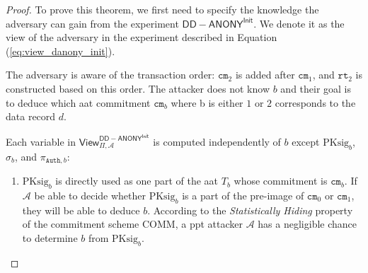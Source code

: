     \begin{proof}
        To prove this theorem, we first need to specify the knowledge the adversary can gain from  the experiment $\mathsf{DD-ANONY}^\mathsf{Init}$. We denote it as the view of the adversary in the experiment described in Equation (\ref{eq:view_danony_init}).


\begin{figure}[h]
\end{figure}


The adversary is aware of the transaction order: $\texttt{cm}_2$ is added after $\texttt{cm}_1$, and $\texttt{rt}_2$ is constructed based on this order. The attacker does not know $b$ and their goal is to deduce which \gls{aat} commitment $\texttt{cm}_b$ where b is either $1$ or $2$ corresponds to the data record $d$.

Each variable in $\mathsf{View}^{\mathsf{DD-ANONY}^\mathsf{Init}}_{\Pi, \mathcal{A}}$ is computed independently of  $b$ except $\text{PKsig}_b$, $\sigma_{b}$, and $\pi_{\texttt{Auth}, b}$:
\begin{enumerate}
    \item $\text{PKsig}_b$ is directly used as one part of the \gls{aat} $T_b$ whose commitment is $\texttt{cm}_b$. If $\mathcal{A}$ be able to decide whether $\text{PKsig}_b$ is a part of the pre-image of $\texttt{cm}_0$ or $\texttt{cm}_1$, they will be able to deduce $b$. According to the \textit{Statistically Hiding} property of the commitment scheme \textsf{COMM}, a \gls{ppt} attacker $\mathcal{A}$ has a negligible chance to determine $b$ from $\text{PKsig}_b$.


\end{enumerate}
\end{proof}
